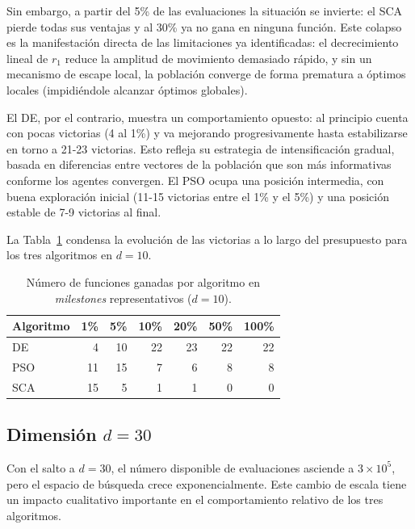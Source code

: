 \documentclass[12pt,a4paper]{article}
\begin{document}
Sin embargo, a partir del 5\% de las evaluaciones la situación se invierte: el SCA pierde todas sus ventajas y al 30\% ya no gana en ninguna función. Este colapso es la manifestación directa de las limitaciones ya identificadas: el decrecimiento lineal de $r_1$ reduce la amplitud de movimiento demasiado rápido, y sin un mecanismo de escape local, la población converge de forma prematura a óptimos locales (impidiéndole alcanzar óptimos globales).
 
El DE, por el contrario, muestra un comportamiento opuesto: al principio cuenta con pocas victorias (4 al 1\%) y va mejorando progresivamente hasta estabilizarse en torno a 21-23 victorias. Esto refleja su estrategia de intensificación gradual, basada en diferencias entre vectores de la población que son más informativas conforme los agentes convergen. El PSO ocupa una posición intermedia, con buena exploración inicial (11-15 victorias entre el 1\% y el 5\%) y una posición estable de 7-9 victorias al final.

La Tabla~\ref{tab:resumen_victorias_d10} condensa la evolución de las victorias a lo largo del presupuesto para los tres algoritmos en $d=10$.

\begin{table}[H]
\centering
\caption{Número de funciones ganadas por algoritmo en \textit{milestones} representativos ($d=10$).}
\label{tab:resumen_victorias_d10}
\renewcommand{\arraystretch}{1.2}
\begin{tabular}{lrrrrrr}
\toprule
\textbf{Algoritmo} & \textbf{1\%} & \textbf{5\%} & \textbf{10\%} & \textbf{20\%} & \textbf{50\%} & \textbf{100\%} \\
\midrule
DE  &  4 & 10 & 22 & 23 & 22 & 22 \\
PSO & 11 & 15 &  7 &  6 &  8 &  8 \\
SCA & 15 &  5 &  1 &  1 &  0 &  0 \\
\bottomrule
\end{tabular}
\end{table}
 
\subsection{Dimensión $d = 30$}
 
Con el salto a $d=30$, el número disponible de evaluaciones asciende a $3 \times 10^5$, pero el espacio de búsqueda crece exponencialmente. Este cambio de escala tiene un impacto cualitativo importante en el comportamiento relativo de los tres algoritmos.
 
\end{document}
